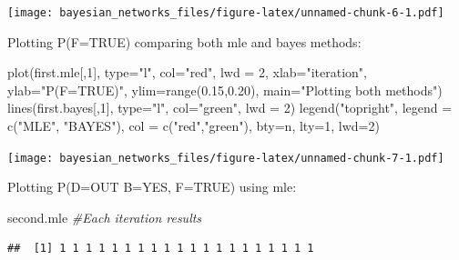 \documentclass[
]{article}
\newenvironment{Shaded}{\begin{snugshade}}{\end{snugshade}}
\newcommand{\AttributeTok}[1]{\textcolor[rgb]{0.77,0.63,0.00}{#1}}
\newcommand{\CommentTok}[1]{\textcolor[rgb]{0.56,0.35,0.01}{\textit{#1}}}
\newcommand{\DecValTok}[1]{\textcolor[rgb]{0.00,0.00,0.81}{#1}}
\newcommand{\FloatTok}[1]{\textcolor[rgb]{0.00,0.00,0.81}{#1}}
\newcommand{\FunctionTok}[1]{\textcolor[rgb]{0.00,0.00,0.00}{#1}}
\newcommand{\NormalTok}[1]{#1}
\newcommand{\StringTok}[1]{\textcolor[rgb]{0.31,0.60,0.02}{#1}}
\begin{document}
\texttt{[image: bayesian\_networks\_files/figure-latex/unnamed-chunk-6-1.pdf]}

Plotting P(F=TRUE) comparing both mle and bayes methods:

\begin{Shaded}
\begin{Highlighting}[]
\FunctionTok{plot}\NormalTok{(first.mle[,}\DecValTok{1}\NormalTok{], }\AttributeTok{type=}\StringTok{"l"}\NormalTok{, }\AttributeTok{col=}\StringTok{"red"}\NormalTok{, }\AttributeTok{lwd =} \DecValTok{2}\NormalTok{, }\AttributeTok{xlab=}\StringTok{"iteration"}\NormalTok{, }\AttributeTok{ylab=}\StringTok{"P(F=TRUE)"}\NormalTok{, }\AttributeTok{ylim=}\FunctionTok{range}\NormalTok{(}\FloatTok{0.15}\NormalTok{,}\FloatTok{0.20}\NormalTok{), }\AttributeTok{main=}\StringTok{"Plotting both methods"}\NormalTok{)}
\FunctionTok{lines}\NormalTok{(first.bayes[,}\DecValTok{1}\NormalTok{], }\AttributeTok{type=}\StringTok{"l"}\NormalTok{, }\AttributeTok{col=}\StringTok{"green"}\NormalTok{, }\AttributeTok{lwd =} \DecValTok{2}\NormalTok{)}
\FunctionTok{legend}\NormalTok{(}\StringTok{"topright"}\NormalTok{, }\AttributeTok{legend =} \FunctionTok{c}\NormalTok{(}\StringTok{"MLE"}\NormalTok{, }\StringTok{"BAYES"}\NormalTok{), }\AttributeTok{col =} \FunctionTok{c}\NormalTok{(}\StringTok{"red"}\NormalTok{,}\StringTok{"green"}\NormalTok{), }\AttributeTok{bty=}\StringTok{\textquotesingle{}n\textquotesingle{}}\NormalTok{, }\AttributeTok{lty=}\DecValTok{1}\NormalTok{, }\AttributeTok{lwd=}\DecValTok{2}\NormalTok{)}
\end{Highlighting}
\end{Shaded}

\texttt{[image: bayesian\_networks\_files/figure-latex/unnamed-chunk-7-1.pdf]}

Plotting P(D=OUT \textbar{} B=YES, F=TRUE) using mle:

\begin{Shaded}
\begin{Highlighting}[]
\NormalTok{second.mle }\CommentTok{\#Each iteration results}
\end{Highlighting}
\end{Shaded}

\begin{verbatim}
##  [1] 1 1 1 1 1 1 1 1 1 1 1 1 1 1 1 1 1 1 1 1
\end{verbatim}
\end{document}
